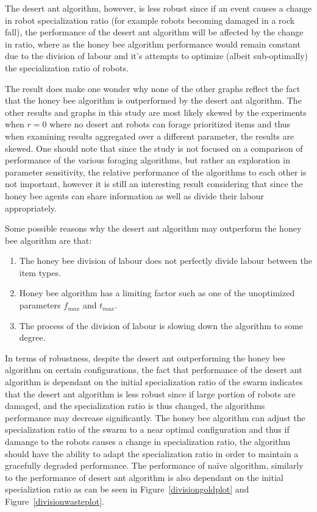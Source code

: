The desert ant algorithm, however, is less robust since if an event causes a change in robot specialization ratio (for example robots becoming damaged in a rock fall), the performance of the desert ant algorithm will be affected by the change in ratio, where as the honey bee algorithm performance would remain constant due to the division of labour and it's attempts to optimize (albeit sub-optimally) the specialization ratio of robots. 

The result does make one wonder why none of the other graphs reflect the fact that the honey bee algorithm is outperformed by the desert ant algorithm. The other results and graphs in this study are most likely skewed by the experiments when $r=0$ where no desert ant robots can forage prioritized items and thus when examining results aggregated over a different parameter, the results are skewed. One should note that since the study is not focused on a comparison of performance of the various foraging algorithms, but rather an exploration in parameter sensitivity, the relative performance of the algorithms to each other is not important, however it is still an interesting result considering that since the honey bee agents can share information as well as divide their labour appropriately. 
 
Some possible reasons why the desert ant algorithm may outperform the honey bee algorithm are that:
\begin{enumerate}
	\item The honey bee division of labour does not perfectly divide labour between the item types.
	\item Honey bee algorithm has a limiting factor such as one of the unoptimized parameters $f_{max}$ and $t_{max}$. 
	\item The process of the division of labour is slowing down the algorithm to some degree.
\end{enumerate}

In terms of robustness, despite the desert ant outperforming the honey bee algorithm on certain configurations, the fact that performance of the desert ant algorithm is dependant on the initial specialization ratio of the swarm indicates that the desert ant algorithm is less robust since if large portion of robots are damaged, and the specialization ratio is thus changed, the algorithms performance may decrease significantly. The honey bee algorithm can adjust the specialization ratio of the swarm to a near optimal configuration and thus if damange to the robots causes a change in specialization ratio, the algorithm should have the ability to adapt the specialization ratio in order to maintain a gracefully degraded performance. The performance of na\"ive algorithm, similarly to the performance of desert ant algorithm is also dependant on the initial specializtion ratio as can be seen in Figure~\ref{divisiongoldplot} and Figure~\ref{divisionwasteplot}. 

